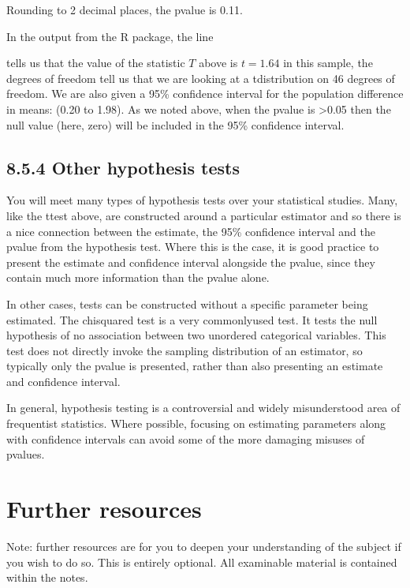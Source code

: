 \documentclass[letterpaper,10pt,english]{jupyterBook}
\begin{document}
\sphinxAtStartPar
Rounding to 2 decimal places, the p\sphinxhyphen{}value is 0.11.

\sphinxAtStartPar
In the output from the R package, the line

\sphinxAtStartPar
{}

\sphinxAtStartPar
tells us that the value of the statistic \(T\) above is \(t=1.64\) in this sample, the degrees of freedom tell us that we are looking at a t\sphinxhyphen{}distribution on 46 degrees of freedom. We are also given a 95\% confidence interval for the population difference in means: (\sphinxhyphen{}0.20 to 1.98). As we noted above, when the p\sphinxhyphen{}value is >0.05 then the null value (here, zero) will be included in the 95\% confidence interval.


\subsection{8.5.4 Other hypothesis tests}
\label{\detokenize{08.f. Frequentist II:other-hypothesis-tests}}
\sphinxAtStartPar
You will meet many types of hypothesis tests over your statistical studies. Many, like the t\sphinxhyphen{}test above, are constructed around a particular estimator and so there is a nice connection between the estimate, the 95\% confidence interval and the p\sphinxhyphen{}value from the hypothesis test. Where this is the case, it is good practice to present the estimate and confidence interval alongside the p\sphinxhyphen{}value, since they contain much more information than the p\sphinxhyphen{}value alone.

\sphinxAtStartPar
In other cases, tests can be constructed without a specific parameter being estimated. The chi\sphinxhyphen{}squared test is a very commonly\sphinxhyphen{}used test. It tests the null hypothesis of no association between two unordered categorical variables. This test does not directly invoke the sampling distribution of an estimator, so typically only the p\sphinxhyphen{}value is presented, rather than also presenting an estimate and confidence interval.

\sphinxAtStartPar
In general, hypothesis testing is a controversial and widely misunderstood area of frequentist statistics. Where possible, focusing on estimating parameters along with confidence intervals can avoid some of the more damaging misuses of p\sphinxhyphen{}values.


\section{Further resources}
\label{\detokenize{08.g. Frequentist II:further-resources}}\label{\detokenize{08.g. Frequentist II::doc}}
\sphinxAtStartPar
Note: further resources are for you to deepen your understanding of the subject if you wish to do so. This is entirely optional. All examinable material is contained within the notes.
\end{document}

